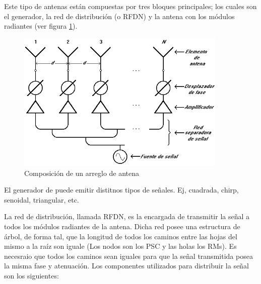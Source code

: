 Este tipo de antenas están compuestas por tres bloques principales; los cuales son el generador, la red de distribución (o RFDN) y la 
antena con los módulos radiantes (ver figura \ref{fig:compositionAntenna}).

\begin{figure}[H]
 \centering
 \includegraphics[width=10cm]{gfx/CompositionAntenna.png}
 \caption{Composición de un arreglo de antena}
 \label{fig:compositionAntenna}
\end{figure}

El generador de puede emitir distitnos tipos de señales. Ej, cuadrada, chirp, senoidal, triangular, etc. 

La red de distribución, llamada RFDN, es la encargada de transmitir la señal a todos los módulos radiantes de la antena. 
Dicha red posee una estructura de árbol, de forma tal, que la longitud de todos los caminos entre las hojas del mismo a 
la raíz son iguale (Los nodos son los PSC y las holas los RMs). Es necesraio que todos los caminos sean iguales para que la 
señal transmitida posea la misma fase y atenuación. Los componentes utilizados para distribuir la señal son los siguientes:

